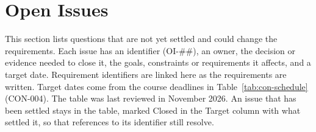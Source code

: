\documentclass[12pt]{article}
\renewcommand{\_}{\textunderscore\allowbreak}%
\begin{document}
\section{Open Issues}
\label{sec:open-issues}

This section lists questions that are not yet settled and could change the
requirements. Each issue has an identifier (OI-\#\#), an owner, the decision or
evidence needed to close it, the goals, constraints or requirements it affects,
and a target date. Requirement identifiers are linked here as the requirements
are written. Target dates come from the course deadlines in
Table~\ref{tab:con-schedule} (CON-004). The table was last reviewed in November
2026. An issue that has been settled stays in the table, marked Closed in the
Target column with what settled it, so that references to its identifier still
resolve.
\end{document}
